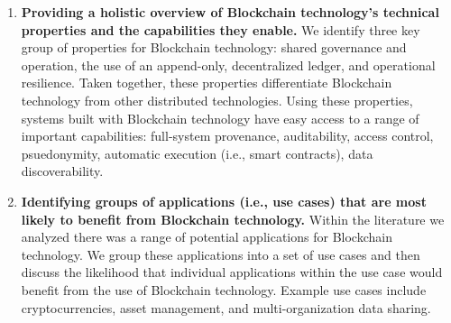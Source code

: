 \begin{enumerate}
	\item \textbf{Providing a holistic overview of Blockchain technology's technical properties and the capabilities they enable.}
	We identify three key group of properties for Blockchain technology: shared governance and operation, the use of an append-only, decentralized ledger, and operational resilience.
	Taken together, these properties differentiate Blockchain technology from other distributed technologies.
	Using these properties, systems built with Blockchain technology have easy access to a range of important capabilities: full-system provenance, auditability, access control, psuedonymity, automatic execution (i.e., smart contracts), data discoverability.
	
	
	
	\item \textbf{Identifying groups of applications (i.e., use cases) that are most likely to benefit from Blockchain technology.}
	Within the literature we analyzed there was a range of potential applications for Blockchain technology.
	We group these applications into a set of use cases and then discuss the likelihood that individual applications within the use case would benefit from the use of Blockchain technology.
	Example use cases include cryptocurrencies, asset management, and multi-organization data sharing.
	

\end{enumerate}
